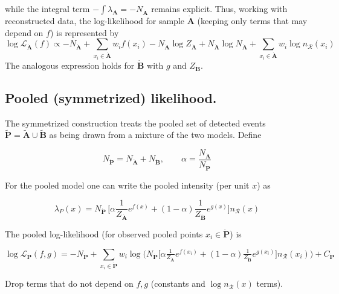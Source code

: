 \documentclass{article}
\newcommand{\dataset}[1]{{\mathbf{#1}}}         %
\newcommand{\meas}[1]{{\dataset{\tilde{#1}}}}   %
\newcommand{\reco}[1]{{\dataset{\dot{#1}}}}     %
\newcommand{\refdist}[1][x]{n_{\mathcal{R}}({#1})}  %
\newcommand{\llikelihood}{\log\mathcal{L}}      %
\begin{document}
while the integral term \(-\int \lambda_{\dataset{A}} = -N_{\reco{A}}\) remains explicit. Thus, working with reconstructed data, the log-likelihood for sample $\reco{A}$ (keeping only terms that may depend on \(f\)) is represented by
\[
\llikelihood_{\reco{A}}(f) \propto -N_{\reco{A}} + \sum_{x_i \in \reco{A}} w_i f(x_i) - N_\reco{A}\log Z_\reco{A} + N_\reco{A}\log N_\reco{A} + \sum_{x_i \in \reco{A}} w_i\log \refdist[x_i]
\]
The analogous expression holds for $\reco{B}$ with \(g\) and \(Z_\reco{B}\).

\subsection{Pooled (symmetrized) likelihood.}
The symmetrized construction treats the pooled set of detected events \(\meas{P}=\meas{A} \cup \meas{B}\) as being drawn from a mixture of the two models. Define

\[
N_\reco{P} = N_\reco{A} + N_\reco{B},\qquad \alpha=\frac{N_\reco{A}}{N_\reco{P}}
\]

For the pooled model one can write the pooled intensity (per unit \(x\)) as

\[
\lambda_{P}(x) = N_\reco{P}\,\Big[\alpha \frac{1}{Z_\reco{A}}e^{f(x)} + (1-\alpha)\frac{1}{Z_\reco{B}}e^{g(x)}\Big] \refdist
\]

The pooled log-likelihood (for observed pooled points \(x_i\in\reco{P}\)) is

\[ \label{eq:pooled_log_likelihood}
\log\mathcal{L}_{\reco{P}}(f,g) = -N_\reco{P} + \sum_{x_i\in\reco{P}} w_i \log\Big(N_\reco{P}\big[\alpha \tfrac{1}{Z_\reco{A}}e^{f(x_i)} + (1-\alpha)\tfrac{1}{Z_\reco{B}}e^{g(x_i)}\big] \refdist[x_i] \Big) + C_{\reco{P}}
\]

Drop terms that do not depend on \(f,g\) (constants and \(\log \refdist\) terms).
\end{document}
